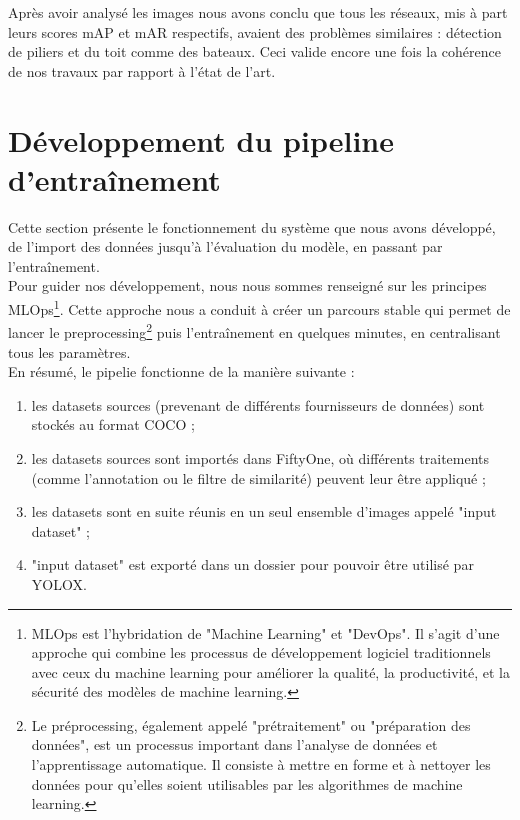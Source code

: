 Après avoir analysé les images nous avons conclu que tous les réseaux, mis à part leurs scores mAP et mAR 
respectifs, avaient des problèmes similaires : détection de piliers et du toit comme des bateaux. 
Ceci valide encore une fois la cohérence de nos travaux par rapport à l'état de l'art. 

\section{Développement du pipeline d'entraînement}

Cette section présente le fonctionnement du système que nous avons développé, de l'import des données
jusqu'à l'évaluation du modèle, en passant par l'entraînement. \\

Pour guider nos développement, nous 
nous sommes renseigné sur les principes MLOps\footnote{MLOps est l'hybridation de "Machine Learning" et "DevOps". 
Il s'agit d'une approche qui combine les processus de développement logiciel traditionnels avec ceux 
du machine learning pour améliorer la qualité, la productivité, et la sécurité des modèles de machine learning.}.
Cette approche nous a conduit à créer un parcours stable qui permet de lancer le preprocessing\footnote{
Le préprocessing, également appelé "prétraitement" ou "préparation des données", 
est un processus important dans l'analyse de données et l'apprentissage automatique. 
Il consiste à mettre en forme et à nettoyer les données pour qu'elles soient utilisables 
par les algorithmes de machine learning.} puis l'entraînement en quelques minutes, en 
centralisant tous les paramètres.\\

En résumé, le pipelie fonctionne de la manière suivante : 

\begin{enumerate}
    \item les datasets sources (prevenant de différents fournisseurs de données) sont stockés au format 
    COCO ;
    \item les datasets sources sont importés dans FiftyOne, où différents traitements (comme 
    l'annotation ou le filtre de similarité) peuvent leur être appliqué ;
    \item les datasets sont en suite réunis en un seul ensemble d'images appelé "input dataset" ; 
    \item "input dataset" est exporté dans un dossier pour pouvoir être utilisé par YOLOX.
\end{enumerate}

